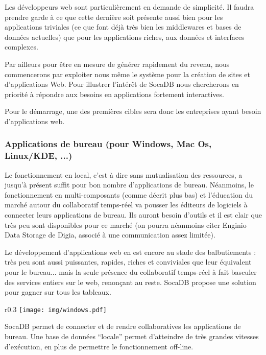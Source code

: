 \documentclass[a4paper,10pt]{scrreprt}
\begin{document}
                Les développeurs web sont particulièrement en demande de simplicité. Il faudra prendre garde à ce que cette dernière soit présente aussi bien pour les applications triviales (ce que font déjà très bien les middlewares et bases de données actuelles) que pour les applications riches, aux données et interfaces complexes.

                \medskip
                Par ailleurs pour être en mesure de générer rapidement du revenu, nous commencerons par exploiter nous même le système pour la création de sites et d'applications Web. Pour illustrer l'intérêt de SocaDB nous chercherons en priorité à répondre aux besoins en applications fortement interactives.
                
                Pour le démarrage, une des premières cibles sera donc les entreprises ayant besoin d'applications web.
                
            \subsubsection{Applications de bureau (pour Windows, Mac Os, Linux/KDE, ...)}
                
                Le fonctionnement en local, c'est à dire sans mutualisation des ressources, a jusqu'à présent suffit pour bon nombre d'applications de bureau. Néanmoins, le fonctionnement en multi-composants (comme décrit plus bas) et l'éducation du marché autour du collaboratif temps-réel va pousser les éditeurs de logiciels à connecter leurs applications de bureau. Ils auront besoin d'outils et il est clair que très peu sont disponibles pour ce marché (on pourra néanmoins citer Enginio Data Storage de Digia, associé à une communication assez limitée).

                
                Le développement d'applications web en est encore au stade des balbutiements : très peu sont aussi puissantes, rapides, riches et conviviales que leur équivalent pour le bureau... mais la seule présence du collaboratif temps-réel à fait basculer des services entiers sur le web, renonçant au reste. SocaDB propose une solution pour gagner sur tous les tableaux.
                
                \begin{wrapfigure}{r}{0.3\textwidth}
                    \hfill
                    \vspace{-0.9em}
                    \texttt{[image: img/windows.pdf]}
                    \begin{center}
                    \begin{scriptsize}
                        SocaDB permet de connecter et de rendre collaboratives les applications de bureau. Une base de données ``locale'' permet d'atteindre de très grandes vitesses d'exécution, en plus de permettre le fonctionnement off-line.
                    \end{scriptsize}
                    \end{center}
                \end{wrapfigure}
                
\end{document}
